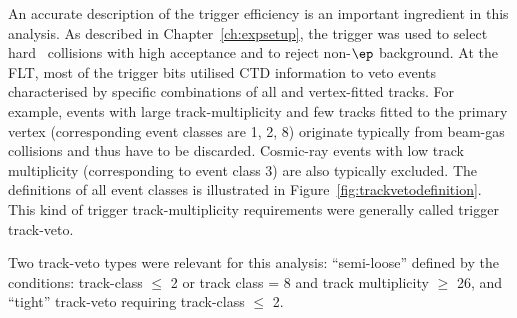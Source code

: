 An accurate description of the trigger efficiency is an important ingredient in this analysis. As described in Chapter~\ref{ch:expsetup}, the \zeus trigger was used to select hard \ep~collisions with high acceptance and to reject non-$\ep$ background. At the FLT, most of the trigger bits utilised CTD information to veto events characterised by specific combinations of all and vertex-fitted tracks. For example, events with large track-multiplicity and few tracks fitted to the primary vertex (corresponding event classes are 1, 2, 8) originate typically from beam-gas collisions and thus have to be discarded. Cosmic-ray events with low track multiplicity (corresponding to event class 3) are also typically excluded. The definitions of all event classes is illustrated in Figure~\ref{fig:trackvetodefinition}. This kind of trigger track-multiplicity requirements were generally called trigger track-veto.

 Two track-veto types were relevant for this analysis: ``semi-loose'' defined by the conditions: track-class $\le$ 2 or track class = 8 and track multiplicity $\ge$ 26, and ``tight'' track-veto requiring track-class $\le$ 2. 

